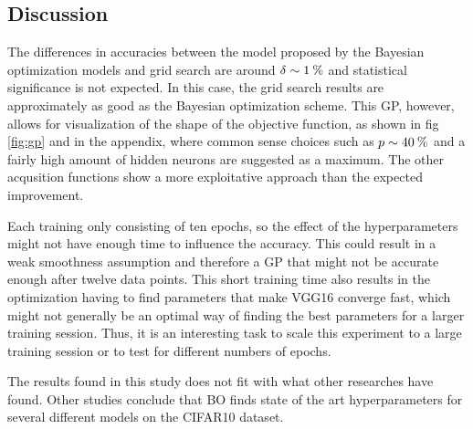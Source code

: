 \documentclass[12pt,fleqn]{article}
\begin{document}
\begin{multicols}{2}
\vspace*{-1.6cm}
\section{Discussion}
\vspace*{-0.2cm}
The differences in accuracies between the model proposed by the Bayesian optimization models and grid search are around \(\delta \sim 1\:\text{\%{}} \) and statistical significance is not expected. In this case, the grid search results are approximately as good as the Bayesian optimization scheme. This GP, however, allows for visualization of the shape of the objective function, as shown in fig \ref{fig:gp} and in the appendix, where common sense choices such as \(p\sim 40\:\text{\%{}} \) and a fairly high amount of hidden neurons are suggested as a maximum. The other acqusition functions show a more exploitative approach than the expected improvement.

Each training only consisting of ten epochs, so the effect of the hyperparameters might not have enough time to influence the accuracy. This could result in a weak smoothness assumption and therefore a GP that might not be accurate enough after twelve data points. This short training time also results in the optimization having to find parameters that make VGG16 converge fast, which might not generally be an optimal way of finding the best parameters for a larger training session. Thus, it is an interesting task to scale this experiment to a large training session or to test for different numbers of epochs.

The results found in this study does not fit with what other researches have found. Other studies conclude that BO finds state of the art hyperparameters for several different models on the CIFAR10 dataset. \cite{baylearn, baylearn2} 

\vspace*{-0.3cm}

\end{multicols}
\end{document}
